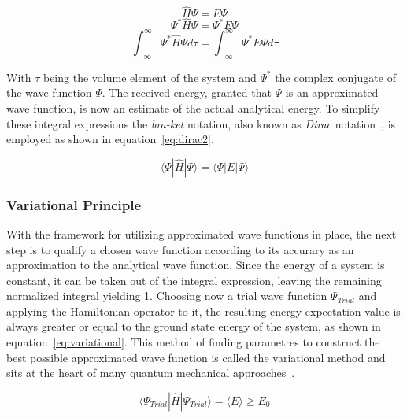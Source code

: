 \documentclass[12pt]{article}
\begin{document}
\begin{equation}
  \hat{H}\Psi = E\Psi
  \label{eq:dirac}
\end{equation}
\begin{equation*}
  \Psi^{*}\hat{H}\Psi = \Psi^{*}E\Psi
\end{equation*}
\begin{equation*}
  \int_{-\infty}^{\infty}\Psi^{*}\hat{H}\Psi d\tau = \int_{-\infty}^{\infty}\Psi^{*}E\Psi d\tau
\end{equation*}

\bigskip

\noindent With $\tau$ being the volume element of the system and $\Psi^{*}$ the complex conjugate of the wave function $\Psi$.
The received energy, granted that $\Psi$ is an approximated wave function, is now an estimate of the actual analytical energy.
To simplify these integral expressions the \textit{bra-ket} notation, also known as \textit{Dirac} notation~\cite{Dirac1939}, is employed as shown in equation~\ref{eq:dirac2}.

\begin{equation}
  \langle\Psi|\hat{H}|\Psi\rangle = \langle\Psi|E|\Psi\rangle
  \label{eq:dirac2}
\end{equation}

\bigskip

\subsubsection{Variational Principle}
With the framework for utilizing approximated wave functions in place, the next step is to qualify a chosen wave function according to its accurary as an approximation to the analytical wave function.
Since the energy of a system is constant, it can be taken out of the integral expression, leaving the remaining normalized integral yielding 1.
Choosing now a trial wave function $\Psi_{Trial}$ and applying the Hamiltonian operator to it, the resulting energy expectation value is always greater or equal to the ground state energy of the system, as shown in equation~\ref{eq:variational}.
This method of finding parametres to construct the best possible approximated wave function is called the variational method and sits at the heart of many quantum mechanical approaches~\cite{Griffiths2017}.

\begin{equation}
  \langle\Psi_{Trial}|\hat{H}|\Psi_{Trial}\rangle = \langle E\rangle \geq E_0
  \label{eq:variational}
\end{equation}
\end{document}
